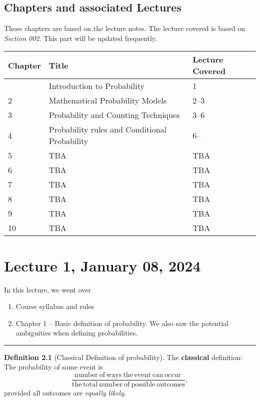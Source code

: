 \documentclass[
]{book}
\providecommand{\tightlist}{%
  \setlength{\itemsep}{0pt}\setlength{\parskip}{0pt}}
\theoremstyle{definition}
\newtheorem{definition}{Definition}[chapter]
\theoremstyle{definition}
\theoremstyle{definition}
\theoremstyle{definition}
\theoremstyle{remark}
\begin{document}
\hypertarget{chapters-and-associated-lectures}{%
\section{Chapters and associated Lectures}\label{chapters-and-associated-lectures}}

Those chapters are based on the lecture notes. The lecture covered is based on \emph{Section 002}. This part will be updated frequently.

\begin{longtable}[]{@{}lll@{}}
\toprule\noalign{}
Chapter & Title & Lecture Covered \\
\midrule\noalign{}
\endhead
\bottomrule\noalign{}
\endlastfoot
1 & Introduction to Probability & 1 \\
2 & Mathematical Probability Models & 2--3 \\
3 & Probability and Counting Techniques & 3--6 \\
4 & Probability rules and Conditional Probability & 6-- \\
5 & TBA & TBA \\
6 & TBA & TBA \\
7 & TBA & TBA \\
8 & TBA & TBA \\
9 & TBA & TBA \\
10 & TBA & TBA \\
\end{longtable}

\hypertarget{lecture-1-january-08-2024}{%
\chapter{Lecture 1, January 08, 2024}\label{lecture-1-january-08-2024}}

In this lecture, we went over

\begin{enumerate}
\def\labelenumi{\arabic{enumi}.}
\tightlist
\item
  Course syllabus and rules
\item
  Chapter 1 -- Basic definition of probability. We also saw the potential ambiguities when defining probabilities.
\end{enumerate}

\begin{center}\rule{0.5\linewidth}{0.5pt}\end{center}

\begin{definition}[Classical Definition of probability]
The \textbf{classical} definition: The probability of some event is
\[
\frac{\mathrm{number~of~ways~the~event~can~occur~}}
{\mathrm{{the~total~number~of~possible~outcomes}}},
\]
provided all outcomes are \emph{equally likely}.
\end{definition}
\end{document}
